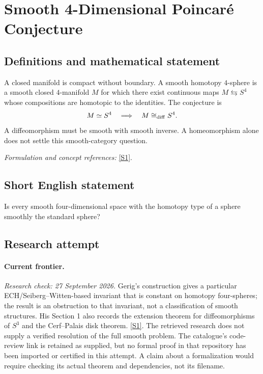 \documentclass[11pt,a4paper]{article}
\newcommand{\sref}[2]{\hyperlink{source:#1:#2}{[S#2]}}
\newif\ifshowcatalogue
\newcommand{\cataloguescope}[1]{\ifshowcatalogue
 \paragraph{Exact scope in the supplied catalogue.}
 \begin{quote}\small #1\end{quote}\fi}
\begin{document}
\setcounter{section}{0}
\clearpage
\section*{\texorpdfstring{Smooth 4-Dimensional Poincaré Conjecture}{Smooth 4-Dimensional Poincaré Conjecture}}\label{statement}
\subsection{Definitions and mathematical statement}
A closed manifold is compact without boundary. A smooth homotopy $4$-sphere is a smooth closed $4$-manifold $M$ for which there exist continuous maps $M\leftrightarrows S^4$ whose compositions are homotopic to the identities. The conjecture is
\[
 M\simeq S^4\quad\Longrightarrow\quad M\cong_{\rm diff} S^4.
\]
A diffeomorphism must be smooth with smooth inverse. A homeomorphism alone does not settle this smooth-category question.
\par\smallskip\textit{Formulation and concept references:} \sref{statement}{1}.
\cataloguescope{Determine whether every smooth closed 4-manifold homotopy equivalent to the standard 4-sphere S\textasciicircum{}4 is diffeomorphic to S\textasciicircum{}4.}
\subsection{Short English statement}
Is every smooth four-dimensional space with the homotopy type of a sphere smoothly the standard sphere?
\subsection{Research attempt}
\paragraph{Current frontier.}
\textit{Research check: 27 September 2026.}
Gerig's construction gives a particular ECH/Seiberg--Witten-based invariant
that is constant on homotopy four-spheres; the result is an obstruction to
that invariant, not a classification of smooth structures. His Section 1
also records the extension theorem for diffeomorphisms of $S^3$ and the
Cerf--Palais disk theorem. \sref{statement}{1}.
The retrieved research does not supply a verified resolution of the full
smooth problem. The catalogue's code-review link is retained as supplied,
but no formal proof in that repository has been imported or certified in
this attempt. A claim about a formalization would require checking its
actual theorem and dependencies, not its filename.
\end{document}
